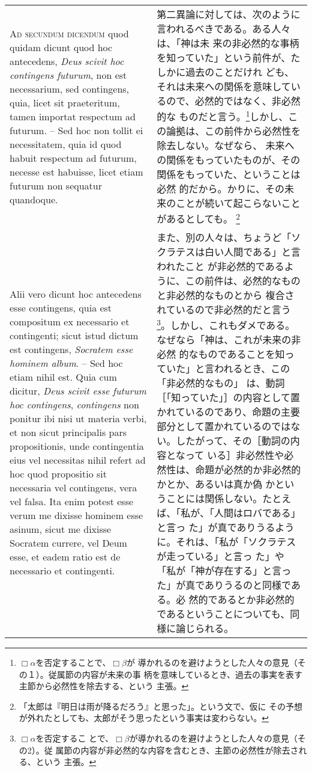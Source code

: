 \documentclass[10pt]{jsarticle} %
\begin{document}
\begin{longtable}{p{21em}p{21em}}
\\


{\scshape Ad secundum dicendum} quod quidam dicunt quod hoc antecedens,
{\itshape Deus scivit hoc contingens futurum}, non est necessarium, sed
contingens, quia, licet sit praeteritum, tamen importat respectum ad
futurum. -- Sed hoc non tollit ei necessitatem, quia id quod habuit
respectum ad futurum, necesse est habuisse, licet etiam futurum non
sequatur quandoque.

&

第二異論に対しては、次のように言われるべきである。ある人々は、「神は未
来の非必然的な事柄を知っていた」という前件が、たしかに過去のことだけれ
ども、それは未来への関係を意味しているので、必然的ではなく、非必然的な
ものだと言う。\footnote{$\Box \alpha$を否定することで、$\Box \beta$が
導かれるのを避けようとした人々の意見（その１）。従属節の内容が未来の事
柄を意味しているとき、過去の事実を表す主節から必然性を除去する、という
主張。}しかし、この論拠は、この前件から必然性を除去しない。なぜなら、
未来への関係をもっていたものが、その関係をもっていた、ということは必然
的だから。かりに、その未来のことが続いて起こらないことがあるとしても。
\footnote{「太郎は『明日は雨が降るだろう』と思った」。という文で、仮に
その予想が外れたとしても、太郎がそう思ったという事実は変わらない。}


\\


Alii vero dicunt hoc antecedens esse contingens, quia est compositum ex
necessario et contingenti; sicut istud dictum est contingens, {\itshape
Socratem esse hominem album}. -- Sed hoc etiam nihil est. Quia cum
dicitur, {\itshape Deus scivit esse futurum hoc contingens}, {\itshape
contingens} non ponitur ibi nisi ut materia verbi, et non sicut
principalis pars propositionis, unde contingentia eius vel necessitas
nihil refert ad hoc quod propositio sit necessaria vel contingens, vera
vel falsa. Ita enim potest esse verum me dixisse hominem esse asinum,
sicut me dixisse Socratem currere, vel Deum esse, et eadem ratio est de
necessario et contingenti.

&

また、別の人々は、ちょうど「ソクラテスは白い人間である」と言われたこと
が非必然的であるように、この前件は、必然的なものと非必然的なものとから
複合されているので非必然的だと言う\footnote{$\Box \alpha$を否定するこ
とで、$\Box \beta$が導かれるのを避けようとした人々の意見（その2）。従
属節の内容が非必然的な内容を含むとき、主節の必然性が除去される、という
主張。}。しかし、これもダメである。なぜなら「神は、これが未来の非必然
的なものであることを知っていた」と言われるとき、この「非必然的なもの」
は、動詞［「知っていた」］の内容として置かれているのであり、命題の主要
部分として置かれているのではない。したがって、その［動詞の内容となって
いる］非必然性や必然性は、命題が必然的か非必然的かとか、あるいは真か偽
かということには関係しない。たとえば、「私が、「人間はロバである」と言っ
た」が真でありうるように。それは、「私が「ソクラテスが走っている」と言っ
た」や「私が「神が存在する」と言った」が真でありうるのと同様である。必
然的であるとか非必然的であるということについても、同様に論じられる。


\end{longtable}
\end{document}

